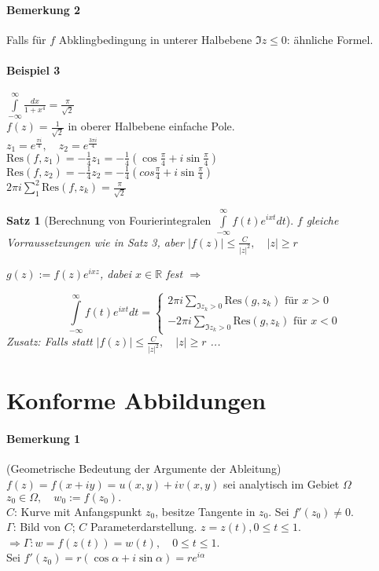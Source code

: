 \documentclass[ngerman,halfparskip]{scrartcl}
\newtheorem{satz}{Satz}[section]
\theoremstyle{definition}
\def\R{\mathbb R}
\def\Res{\text{Res}}
\begin{document}
\paragraph{Bemerkung 2} Falls für $f$ Abklingbedingung in unterer Halbebene $\Im z \leq 0$: ähnliche Formel.
\paragraph{Beispiel 3} $\int\limits_{-\infty}^\infty \frac{dx}{1+x^4}=\frac {\pi}{\sqrt 2}$\\
$f(z)=\frac {1}{\sqrt 2}$ in oberer Halbebene einfache Pole. \\
$z_1=e^{\frac {\pi i}4}, \quad z_2=e^{\frac{3\pi i}4}$\\
$\Res(f,z_1)=-\frac 14 z_1=-\frac 14 (\cos \frac \pi 4 + i \sin \frac \pi 4)$\\
$\Res(f,z_2)=-\frac 14 z_2=-\frac 14 (cos \frac \pi 4 + i \sin \frac \pi 4)$\\
$2\pi i \sum _1^2 \Res(f,z_k)=\frac \pi {\sqrt 2}$

\begin{satz}[Berechnung von Fourierintegralen $\int\limits_{-\infty}^\infty f(t)e^{ixt}dt$]
$f$ gleiche Vorraussetzungen wie in Satz 3, aber $|f(z)|\leq \frac C{|z|^2}, \quad |z|\geq r$

$g(z):=f(z)e^{ixz}$, dabei $x\in\R$ fest $\Rightarrow$

$$\int\limits_{-\infty}^\infty f(t)e^{ixt}dt=\begin{cases}
2\pi i \sum\limits_{\Im z_k>0}\Res(g,z_k) \text{ für } x>0\\
-2\pi i \sum\limits_{\Im z_k>0}\Res(g,z_k) \text{ für } x<0
\end{cases}$$
Zusatz: Falls statt $|f(z)|\leq \frac C{|z|^2}, \quad |z|\geq r$ ...
\end{satz}

\section{Konforme Abbildungen}
\paragraph{Bemerkung 1} (Geometrische Bedeutung der Argumente der Ableitung)\\
$f(z)=f(x+iy)=u(x,y)+iv(x,y)$ sei analytisch im Gebiet $\Omega$\\
$z_0\in\Omega, \quad w_0:=f(z_0).$ \\
$C$: Kurve mit Anfangspunkt $z_0$, besitze Tangente in $z_0$. Sei $f'(z_0)\neq 0$.\\
$\Gamma$: Bild von $C$; $C$ Parameterdarstellung. $z=z(t), 0\leq t\leq 1$.\\
$\Rightarrow \Gamma: w=f(z(t))=w(t), \quad 0\leq t\leq 1$.\\
Sei $f'(z_0)=r(\cos\alpha+i\sin\alpha)=re^{i\alpha}$
\end{document}
